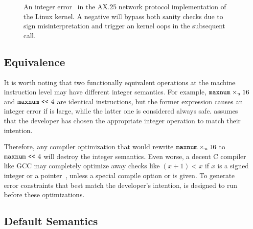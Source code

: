 \begin{figure}
\centering

\vspace{-1em}
\caption{An integer error~\cite[CVE-2009-2909]{cve} in the AX.25
network protocol implementation of the Linux kernel.  A negative
 will bypass both sanity checks due to sign misinterpretation
 and trigger an kernel
oops in the subsequent  call.}
\label{f:ax25-sign}
\end{figure}

\subsection{Equivalence}

It is worth noting that two functionally equivalent operations at
the machine instruction level may have different integer semantics.
For example, $\texttt{maxnum}\times_u 16$ and $\texttt{maxnum} \ \texttt{<}\texttt{<}\  4$ are
identical instructions, but the former expression causes an integer
error if  is large, while the latter one is considered
always safe.  \sys assumes that the developer has chosen the
appropriate integer operation to match their intention.

Therefore, any compiler optimization that would rewrite
$\texttt{maxnum}\times_u 16$ to $\texttt{maxnum} \ \texttt{<}\texttt{<}\  4$ will destroy the
integer semantics.  Even worse, a decent C compiler like GCC may completely
optimize away checks like $(x + 1) < x$ if $x$ is a signed integer
or a pointer~\cite{gcc:signed-overflow,us-cert:gcc}, unless a special
compile option  or  is given.
To generate error constraints that best match the developer's
intention, \sys is designed to run before these optimizations.

\subsection{Default Semantics}

